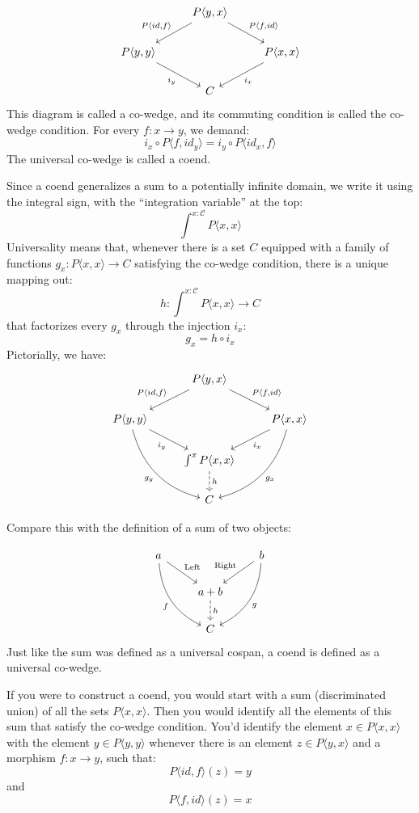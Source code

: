\documentclass[DaoFP]{subfiles}
\begin{document}
\[
 \begin{tikzcd}
 &P \langle y, x \rangle
 \arrow[ld, "{P \langle id, f \rangle}"']
 \arrow[rd, "{P \langle f, id \rangle}"]
 \\
 P \langle y, y \rangle
 \arrow[dr, "i_y"']
 &&P \langle x, x \rangle
 \arrow[dl, "i_x"]
 \\
 &C
 \end{tikzcd}
\]
This diagram is called a co-wedge, and its commuting condition is called the co-wedge condition. For every $f \colon x \to y$, we demand:
\[ i_x \circ P \langle f, id_y \rangle = i_y \circ P \langle id_x, f \rangle \]
The universal co-wedge is called a coend.

Since a coend generalizes a sum to a potentially infinite domain, we write it using the integral sign, with the ``integration variable'' at the top:
\[ \int^{x\colon \mathcal{C}} P \langle x, x \rangle \]
Universality means that, whenever there is a set $C$ equipped with a family of functions $g_x \colon P \langle x, x \rangle \to C$ satisfying the co-wedge condition, there is a unique mapping out:
\[ h \colon \int^{x\colon \mathcal{C}} P \langle x, x \rangle \to C \]
that factorizes every $g_x$ through the injection $i_x$:
\[ g_x = h \circ i_x \]
Pictorially, we have:
\[
 \begin{tikzcd}
 &P \langle y, x \rangle
 \arrow[ld, "{P \langle id, f \rangle}"']
 \arrow[rd, "{P \langle f, id \rangle}"]
 \\
 P \langle y, y \rangle
 \arrow[dr, "i_y"']
 \arrow[ddr, bend right,  "g_y"']
 &&P \langle x, x \rangle
 \arrow[dl, "i_x"]
 \arrow[ddl, bend left,  "g_x"]
 \\
 &\int^x P \langle x, x \rangle
 \arrow[d, dashed, "h"]
 \\
 &C
 \end{tikzcd}
\]

Compare this with the definition of a sum of two objects:

\[
 \begin{tikzcd}
 a
 \arrow[dr, "\text{Left}"]
 \arrow[ddr, bend right, "f"']
 && b
 \arrow[dl, "\text{Right}"']
 \arrow[ddl, bend left, "g"]
 \\
&a + b
\arrow[d, dashed, "h"]
\\
& C
 \end{tikzcd}
\]
Just like the sum was defined as a universal cospan, a coend is defined as a universal co-wedge. 

If you were to construct a coend, you would start with a sum (discriminated union) of all the sets $P \langle x, x \rangle$. Then you would identify all the elements of this sum that satisfy the co-wedge condition. You'd identify the element $x \in P \langle x, x \rangle$ with the element $y \in P \langle y, y \rangle$ whenever there is an element $z  \in P \langle y, x \rangle$ and a morphism $f \colon x \to y$, such that:
\[ P \langle id, f \rangle (z) = y\]
and
\[ P \langle f, id \rangle (z) = x\]
\end{document}
